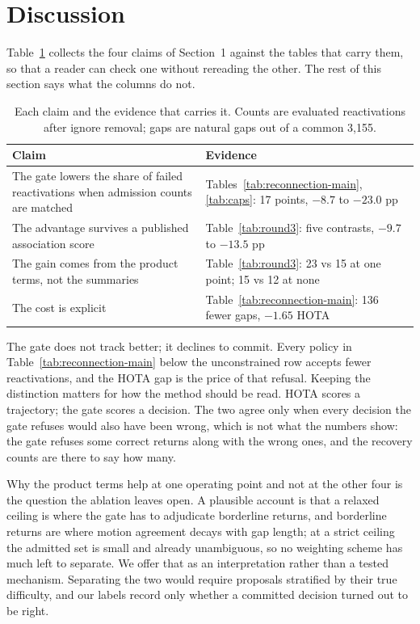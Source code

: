 \section{Discussion}

Table~\ref{tab:claims} collects the four claims of Section~1 against the
tables that carry them, so that a reader can check one without rereading
the other. The rest of this section says what the columns do not.

\begin{table}[t]
\centering
\footnotesize
\setlength{\tabcolsep}{4pt}
\caption{Each claim and the evidence that carries it. Counts are evaluated
reactivations after ignore removal; gaps are natural gaps out of a common
3,155.}
\label{tab:claims}
\begin{tabular}{p{4.4cm}p{2.9cm}}
\hline
Claim & Evidence \\
\hline
The gate lowers the share of failed reactivations when admission counts are
matched & Tables~\ref{tab:reconnection-main}, \ref{tab:caps}: 17 points,
$-8.7$ to $-23.0$ pp \\
The advantage survives a published association score & Table~\ref{tab:round3}:
five contrasts, $-9.7$ to $-13.5$ pp \\
The gain comes from the product terms, not the summaries & Table~\ref{tab:round3}:
23 vs 15 at one point; 15 vs 12 at none \\
The cost is explicit & Table~\ref{tab:reconnection-main}: 136 fewer gaps,
$-1.65$ HOTA \\
\hline
\end{tabular}
\end{table}

The gate does not track better; it declines to commit. Every policy in
Table~\ref{tab:reconnection-main} below the unconstrained row accepts fewer
reactivations, and the HOTA gap is the price of that refusal. Keeping the
distinction matters for how the method should be read. HOTA scores a
trajectory; the gate scores a decision. The two agree only when every
decision the gate refuses would also have been wrong, which is not what the
numbers show: the gate refuses some correct returns along with the wrong
ones, and the recovery counts are there to say how many.

Why the product terms help at one operating point and not at the other four
is the question the ablation leaves open. A plausible account is that a
relaxed ceiling is where the gate has to adjudicate borderline returns, and
borderline returns are where motion agreement decays with gap length; at a
strict ceiling the admitted set is small and already unambiguous, so no
weighting scheme has much left to separate. We offer that as an
interpretation rather than a tested mechanism. Separating the two would
require proposals stratified by their true difficulty, and our labels
record only whether a committed decision turned out to be right.

